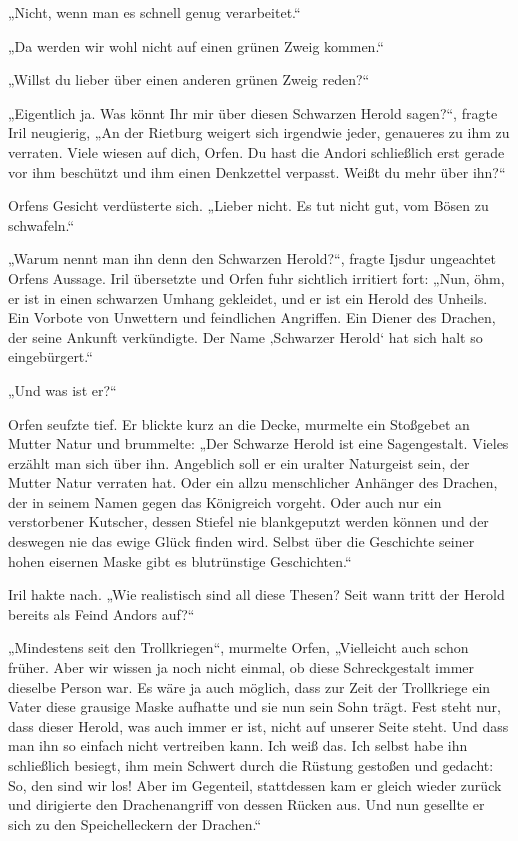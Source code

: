 „Nicht, wenn man es schnell genug verarbeitet.“

„Da werden wir wohl nicht auf einen grünen Zweig kommen.“

„Willst du lieber über einen anderen grünen Zweig reden?“

„Eigentlich ja. Was könnt Ihr mir über diesen Schwarzen Herold sagen?“, fragte Iril neugierig, „An der Rietburg weigert sich irgendwie jeder, genaueres zu ihm zu verraten. Viele wiesen auf dich, Orfen. Du hast die Andori schließlich erst gerade vor ihm beschützt und ihm einen Denkzettel verpasst. Weißt du mehr über ihn?“

Orfens Gesicht verdüsterte sich. „Lieber nicht. Es tut nicht gut, vom Bösen zu schwafeln.“

„Warum nennt man ihn denn den Schwarzen Herold?“, fragte Ijsdur ungeachtet Orfens Aussage. Iril übersetzte und Orfen fuhr sichtlich irritiert fort: „Nun, öhm, er ist in einen schwarzen Umhang gekleidet, und er ist ein Herold des Unheils. Ein Vorbote von Unwettern und feindlichen Angriffen. Ein Diener des Drachen, der seine Ankunft verkündigte. Der Name ‚Schwarzer Herold‘ hat sich halt so eingebürgert.“

„Und was ist er?“

Orfen seufzte tief. Er blickte kurz an die Decke, murmelte ein Stoßgebet an Mutter Natur und brummelte: „Der Schwarze Herold ist eine Sagengestalt. Vieles erzählt man sich über ihn. Angeblich soll er ein uralter Naturgeist sein, der Mutter Natur verraten hat. Oder ein allzu menschlicher Anhänger des Drachen, der in seinem Namen gegen das Königreich vorgeht. Oder auch nur ein verstorbener Kutscher, dessen Stiefel nie blankgeputzt werden können und der deswegen nie das ewige Glück finden wird. Selbst über die Geschichte seiner hohen eisernen Maske gibt es blutrünstige Geschichten.“

Iril hakte nach. „Wie realistisch sind all diese Thesen? Seit wann tritt der Herold bereits als Feind Andors auf?“

„Mindestens seit den Trollkriegen“, murmelte Orfen, „Vielleicht auch schon früher. Aber wir wissen ja noch nicht einmal, ob diese Schreckgestalt immer dieselbe Person war. Es wäre ja auch möglich, dass zur Zeit der Trollkriege ein Vater diese grausige Maske aufhatte und sie nun sein Sohn trägt. Fest steht nur, dass dieser Herold, was auch immer er ist, nicht auf unserer Seite steht. Und dass man ihn so einfach nicht vertreiben kann. Ich weiß das. Ich selbst habe ihn schließlich besiegt, ihm mein Schwert durch die Rüstung gestoßen und gedacht: So, den sind wir los! Aber im Gegenteil, stattdessen kam er gleich wieder zurück und dirigierte den Drachenangriff von dessen Rücken aus. Und nun gesellte er sich zu den Speichelleckern der Drachen.“

